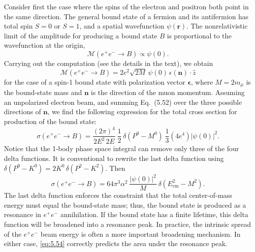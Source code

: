Consider first the case where the spins of the electron and positron both
point in the same direction.  The general bound state of a fermion and its
antifermion has total spin $S = 0$ or $S = 1$, and a spatial wavefunction
$\psi(\mathbf{r})$.  The nonrelativistic limit of the amplitude for producing
a bound state $B$ is proportional to the wavefunction at the origin,
\begin{equation}
  \mathcal{M}(e^{+}e^{-}\to B) \propto \psi(0) .
  \label{eq:5.50}
\end{equation}
Carrying out the computation (see the details in the text), we obtain
\begin{equation}
  \mathcal{M}(e^{+}e^{-}\to B) = 2e^2\sqrt{2M}\,\psi(0)\,
    \epsilon(\mathbf{n})\cdot\hat{z}
  \label{eq:5.51}
\end{equation}
for the case of a spin-1 bound state with polarization vector
$\bm{\epsilon}$, where $M = 2m_\mu$ is the bound-state mass and
$\mathbf{n}$ is the direction of the muon momentum.  Assuming an unpolarized
electron beam, and summing Eq.~(5.52) over the three possible directions
of $\mathbf{n}$, we find the following expression for the total cross section
for production of the bound state:
\begin{equation}
  \sigma(e^{+}e^{-}\to B) =
    \frac{(2\pi)^4}{2E^2\,2E}\ \frac{1}{2}\ \delta(P^0 - M^0)\
    \frac{1}{3}(4e^4)|\psi(0)|^2 .
  \label{eq:5.53}
\end{equation}
Notice that the 1-body phase space integral can remove only three of the four
delta functions.  It is conventional to rewrite the last delta function using
$\delta(P^0 - K^0) = 2K^0\,\delta(P^2 - K^2)$.  Then
\begin{equation}
  \sigma(e^{+}e^{-}\to B) = 64\pi^3\alpha^2\ \frac{|\psi(0)|^2}{M}\
    \delta(E^2_{\mathrm{cm}} - M^2) .
  \label{eq:5.54}
\end{equation}
The last delta function enforces the constraint that the total center-of-mass
energy must equal the bound-state mass; thus, the bound state is produced as a
resonance in $e^{+}e^{-}$ annihilation.  If the bound state has a finite
lifetime, this delta function will be broadened into a resonance peak.  In
practice, the intrinsic spread of the $e^{+}e^{-}$ beam energy is often a more
important broadening mechanism.  In either case, \eqref{eq:5.54} correctly
predicts the area under the resonance peak.

